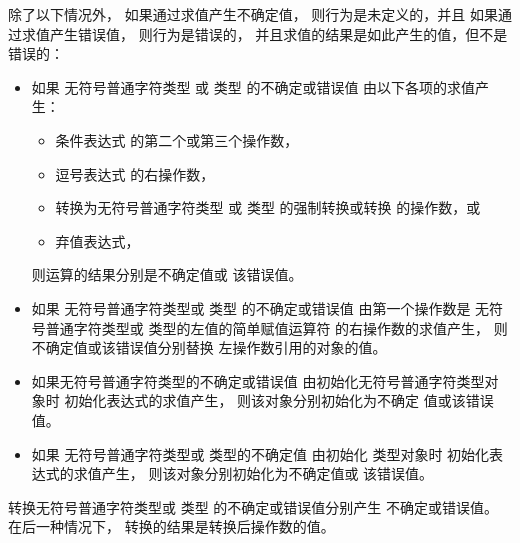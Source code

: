 \pnum
除了以下情况外，
如果通过求值产生不确定值，
则行为是未定义的，并且
如果通过求值产生错误值，
则行为是错误的，
并且求值的结果是如此产生的值，但不是错误的：
\begin{itemize}
\item
  如果
  无符号普通字符类型
  或  类型
  的不确定或错误值
  由以下各项的求值产生：
  \begin{itemize}
  \item
    条件表达式 的第二个或第三个操作数，
  \item
    逗号表达式 的右操作数，
  \item
    转换为无符号普通字符类型
    或  类型 的强制转换或转换
    的操作数，或
  \item
    弃值表达式，
  \end{itemize}
  则运算的结果分别是不确定值或
  该错误值。
\item
  如果
  无符号普通字符类型或  类型
  的不确定或错误值
  由第一个操作数是
  无符号普通字符类型或  类型的左值的简单赋值运算符
  的右操作数的求值产生，
  则不确定值或该错误值分别替换
  左操作数引用的对象的值。
\item
  如果无符号普通字符类型的不确定或错误值
  由初始化无符号普通字符类型对象时
  初始化表达式的求值产生，
  则该对象分别初始化为不确定
  值或该错误值。
\item
  如果
  无符号普通字符类型或  类型的不确定值
  由初始化  类型对象时
  初始化表达式的求值产生，
  则该对象分别初始化为不确定值或
  该错误值。
\end{itemize}
转换无符号普通字符类型或  类型
的不确定或错误值分别产生
不确定或错误值。
在后一种情况下，
转换的结果是转换后操作数的值。
